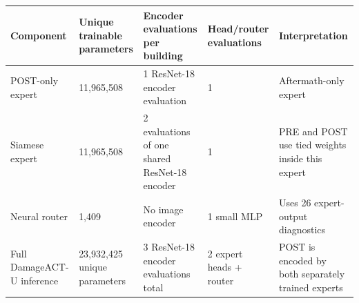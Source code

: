 \begin{tabular}{lllll}
\toprule
Component & Unique trainable parameters & Encoder evaluations per building & Head/router evaluations & Interpretation \\
\midrule
POST-only expert & 11,965,508 & 1 ResNet-18 encoder evaluation & 1 & Aftermath-only expert \\
Siamese expert & 11,965,508 & 2 evaluations of one shared ResNet-18 encoder & 1 & PRE and POST use tied weights inside this expert \\
Neural router & 1,409 & No image encoder & 1 small MLP & Uses 26 expert-output diagnostics \\
Full DamageACT-U inference & 23,932,425 unique parameters & 3 ResNet-18 encoder evaluations total & 2 expert heads + router & POST is encoded by both separately trained experts \\
\bottomrule
\end{tabular}
